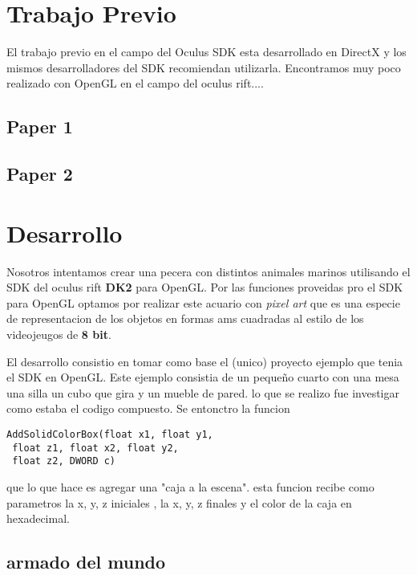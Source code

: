 \documentclass[10pt, a4paper, twocolumn]{article}
\begin{document}
\section{Trabajo Previo}

El trabajo previo en el campo del Oculus SDK esta desarrollado en DirectX y los mismos desarrolladores del SDK recomiendan utilizarla. Encontramos muy poco realizado con OpenGL en el campo del oculus rift....


\subsection{Paper 1}



\subsection{Paper 2}


\section{Desarrollo}
Nosotros intentamos crear una pecera  con distintos animales marinos utilisando el SDK del oculus rift  \textbf{DK2} para OpenGL. Por las funciones proveidas pro el SDK para OpenGL optamos por realizar este acuario con \textit{pixel art} que es una especie de representacion de los objetos en formas ams cuadradas al estilo de los videojeugos de \textbf{8 bit}.

El desarrollo consistio en tomar como base el (unico) proyecto ejemplo que tenia el SDK en OpenGL. Este ejemplo consistia de un pequeño cuarto con una mesa una silla un cubo que gira y un mueble de pared. lo que se realizo fue investigar como estaba el codigo compuesto. Se entonctro la funcion
\begin{lstlisting}
AddSolidColorBox(float x1, float y1,
 float z1, float x2, float y2, 
 float z2, DWORD c)
\end{lstlisting}
que lo que hace es agregar una "caja a la escena". esta funcion recibe como parametros la x, y, z iniciales , la x, y, z finales y el color de la caja en hexadecimal.

\subsection{armado del mundo}
\end{document}
